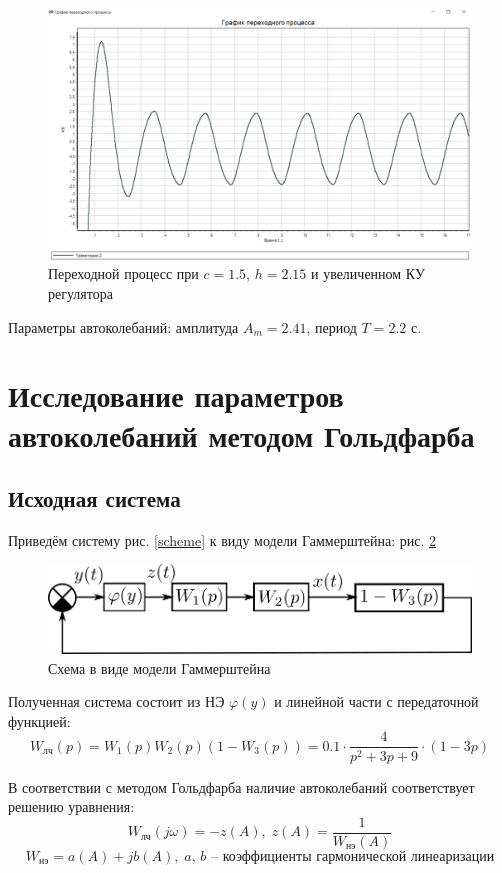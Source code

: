 	\begin{figure}[h]
		\centering\includegraphics[width=.7\textwidth]{png/PP_lambda6.png}
		\caption{Переходной процесс при $c=1.5$, $h=2.15$ и увеличенном КУ регулятора}
		\label{sp_lambda6}
	\end{figure}
	
	Параметры автоколебаний: амплитуда $A_m = 2.41$, период $T=2.2$ с.
	
	\section[Метод Гольдфарба]{Исследование параметров автоколебаний методом Гольдфарба}
	
	\subsection{Исходная система}
	
	Приведём систему рис. \ref{scheme} к виду модели Гаммерштейна: рис. \ref{scheme2}
	
	\begin{figure}[h]
		\centering\includegraphics[width=.7\textwidth]{png/Схема_Гаммерштейн.png}
		\caption{Схема в виде модели Гаммерштейна}
		\label{scheme2}
	\end{figure}
	
	Полученная система состоит из НЭ $\varphi(y)$ и линейной части  с передаточной функцией:
	\begin{equation*}
		W_{\text{лч}}(p) = W_1(p)W_2(p)(1-W_3(p)) = 0.1\cdot\frac{4}{p^2+3p+9}\cdot(1-3p)
	\end{equation*} 
	
	В соответствии с методом Гольдфарба наличие автоколебаний соответствует решению уравнения:
	\begin{equation*}
		W_{\text{лч}}(j\omega) = -z(A),\;z(A) = \frac{1}{W_{\text{нэ}}(A)}
	\end{equation*}
	\begin{equation*}
		W_\text{нэ} = a(A) + jb(A),\; a,\,b\text{ -- коэффициенты гармонической линеаризации}
	\end{equation*}
	

